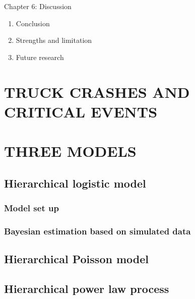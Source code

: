 \documentclass[12pt]{book}
\numberwithin{equation}{chapter}
\providecommand{\tightlist}{%
  \setlength{\itemsep}{0pt}\setlength{\parskip}{0pt}}
\begin{document}
Chapter 6: Discussion

\begin{enumerate}
\def\labelenumi{\arabic{enumi}.}
\tightlist
\item
  Conclusion
\item
  Strengths and limitation
\item
  Future research
\end{enumerate}

\hypertarget{truck-crashes-and-critical-events}{%
\chapter{TRUCK CRASHES AND CRITICAL EVENTS}\label{truck-crashes-and-critical-events}}

\hypertarget{three-models}{%
\chapter{THREE MODELS}\label{three-models}}

\hypertarget{hierarchical-logistic-model}{%
\section{Hierarchical logistic model}\label{hierarchical-logistic-model}}

\hypertarget{model-set-up}{%
\subsection{Model set up}\label{model-set-up}}

\hypertarget{bayesian-estimation-based-on-simulated-data}{%
\subsection{Bayesian estimation based on simulated data}\label{bayesian-estimation-based-on-simulated-data}}

\hypertarget{hierarchical-poisson-model}{%
\section{Hierarchical Poisson model}\label{hierarchical-poisson-model}}

\hypertarget{hierarchical-power-law-process}{%
\section{Hierarchical power law process}\label{hierarchical-power-law-process}}
\end{document}
